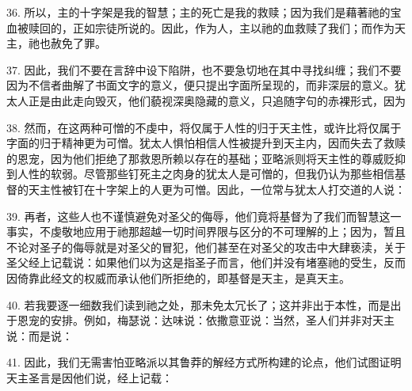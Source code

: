 36. 所以，主的十字架是我的智慧；主的死亡是我的救赎；因为我们是藉著祂的宝血被赎回的，正如宗徒所说的。因此，作为人，主以祂的血救赎了我们；而作为天主，祂也赦免了罪。\par

37. 因此，我们不要在言辞中设下陷阱，也不要急切地在其中寻找纠缠；我们不要因为不信者曲解了书面文字的意义，便只提出字面所呈现的，而非深层的意义。犹太人正是由此走向毁灭，他们藐视深奥隐藏的意义，只追随字句的赤裸形式，因为\par

38. 然而，在这两种可憎的不虔中，将仅属于人性的归于天主性，或许比将仅属于字面的归于精神更为可憎。犹太人惧怕相信人性被提升到天主内，因而失去了救赎的恩宠，因为他们拒绝了那救恩所赖以存在的基础；亚略派则将天主性的尊威贬抑到人性的软弱。尽管那些钉死主之肉身的犹太人是可憎的，但我仍认为那些相信基督的天主性被钉在十字架上的人更为可憎。因此，一位常与犹太人打交道的人说：\par

39. 再者，这些人也不谨慎避免对圣父的侮辱，他们竟将基督为了我们而智慧这一事实，不虔敬地应用于祂那超越一切时间界限与区分的不可理解的上；因为，暂且不论对圣子的侮辱就是对圣父的冒犯，他们甚至在对圣父的攻击中大肆亵渎，关于圣父经上记载说：如果他们以为这是指圣子而言，他们并没有堵塞祂的受生，反而因倚靠此经文的权威而承认他们所拒绝的，即基督是天主，是真天主。\par

40. 若我要逐一细数我们读到祂之处，那未免太冗长了；这并非出于本性，而是出于恩宠的安排。例如，梅瑟说：达味说：依撒意亚说：当然，圣人们并非对天主说：而是说：\par

\par

41. 因此，我们无需害怕亚略派以其鲁莽的解经方式所构建的论点，他们试图证明天主圣言是因他们说，经上记载：\par

